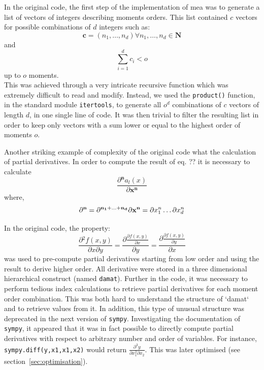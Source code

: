 \documentclass[11pt,a4paper]{article}
\newcommand{\sympy}{\texttt{sympy}}
\begin{document}
In the original code, the first step of the implementation of \acrshort{mea} was to generate a list of vectors of integers describing moments orders.
This list contained $c$ vectors for possible combinations of $d$ integers such as:\\
\[\mathbf{c} =(n_1, \dots, n_d) \forall{n_1, \dots, n_d \in \mathbf{N}}\]
and\\
\[\sum_{i=1}^{d} c_i < o\]
up to $o$ moments.\\

This was achieved through a very intricate recursive function which was extremely difficult to read and modify.
Instead, we used the \texttt{product()} function, in the standard module \texttt{itertools},
to generate all $o^d$ combinations of $c$ vectors of length  $d$, in one single line of code.
It was then trivial to filter the resulting list in order to keep only vectors with a sum lower or equal to the highest order of moments $o$.

Another striking example of complexity of the original code what the calculation of partial derivatives.
In order to compute the result of eq. ??\cite{ale_general_2013} it is necessary to calculate\\
\[\frac{\partial{}^\mathbf{n} a_l(x)}{\partial{}\mathbf{x^n}}\]
where,\\
\[\partial{}^\mathbf{n} = \partial{}^\mathbf{n_1+\dots{}+n_d} \\
\partial{} \mathbf{x^n} = \partial{} x^n_1 \dots{} \partial x^n_d\]

In the original code, the property:
\begin{equation}
\label{eq:partial}
\frac{\partial{} ^ 2 f(x,y)}{\partial x \partial y} =
\frac{\partial{} \frac{\partial{} f(x,y)}{\partial x}}{\partial y} =
\frac{\partial{} \frac{\partial{} f(x,y)}{\partial{} y}}{\partial{} x}
\end{equation}
was used to pre-compute partial derivatives starting from low order and using the result to derive higher order.
All derivative were stored in a three dimensional hierarchical construct (named \texttt{damat}).
Further in the code, it was necessary to perform  tedious index calculations to
retrieve partial derivatives for each moment order combination.
This was both hard to understand the structure of `damat` and to retrieve values from it.
In addition, this type of unusual structure was deprecated in the next version of \sympy{}.
Investigating the documentation of \sympy, it appeared that it was in fact possible to directly compute partial derivatives
with respect to arbitrary number and order of variables.
For instance, \texttt{sympy.diff(y,x1,x1,x2)} would return $\frac{\partial^3 y}{\partial x_1^2 \partial x_2}$.
This was later optimised (see section~\ref{sec:optimisation}).
\end{document}
